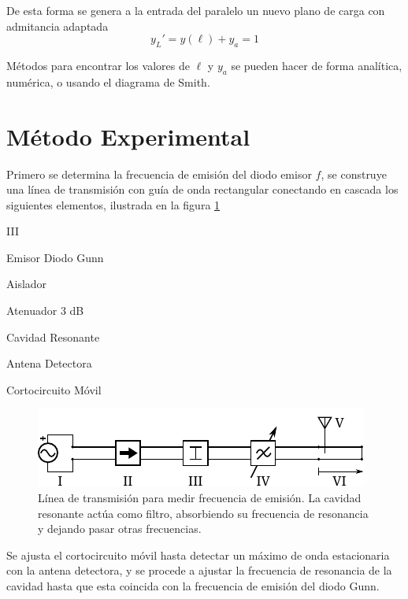 \documentclass[11pt,a4paper]{article}
\begin{document}
\begin{multicols}{2}
De esta forma se genera a la entrada del paralelo un nuevo plano de carga con admitancia adaptada 
$$y_L' = y(\ell) + y_a = 1$$

Métodos para encontrar los valores de $\ell$ y $y_a$ se pueden hacer de forma analítica, numérica, o usando el diagrama de Smith.

\section{Método Experimental}

Primero se determina la frecuencia de emisión del diodo emisor $f$, se construye una línea de transmisión con guía de onda rectangular conectando en cascada los siguientes elementos, ilustrada en la figura \ref{fig:arr1}
\begin{multicols}{2}
    \begin{labeling}{III} 
        \item [I] Emisor Diodo Gunn
        \item [II] Aislador
        \item [III] Atenuador 3 dB
        \item [IV] Cavidad Resonante
        \item [V] Antena Detectora
        \item [VI] Cortocircuito Móvil
    \end{labeling}        
\end{multicols}
\begin{figure}[H]
    \centering
    \includegraphics[width=\linewidth]{Images/arreglo1.pdf}
    \caption{Línea de transmisión para medir frecuencia de emisión. La cavidad resonante actúa como filtro, absorbiendo su frecuencia de resonancia y dejando pasar otras frecuencias.}
    \label{fig:arr1}
\end{figure}
Se ajusta el cortocircuito móvil hasta detectar un máximo de onda estacionaria con la antena detectora, y se procede a ajustar la frecuencia de resonancia de la cavidad hasta que esta coincida con la frecuencia de emisión del diodo Gunn.\\


\end{multicols}
\end{document}
